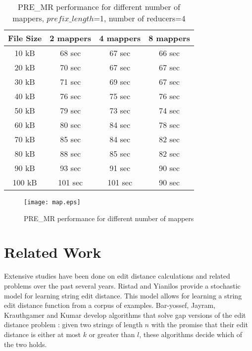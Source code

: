 \documentclass[conference]{IEEEtran}
\begin{document}
\begin{table}[htbp]
\caption{PRE\_MR performance for different number of mappers, $prefix\_length$=1, number of reducers=4}
\centering
\vspace{5pt}
\begin{tabular}{|c|c|c|c|}
\hline
\textbf{File Size} & \textbf{2 mappers} & \textbf{4 mappers} & \textbf{8 mappers}\\
\hline\hline
10 kB & 68 sec & 67 sec & 66 sec\\
\hline
20 kB & 70 sec & 67 sec & 67 sec\\
\hline
30 kB & 71 sec & 69 sec & 67 sec\\
\hline
40 kB & 76 sec & 75 sec & 76 sec\\
\hline
50 kB & 79 sec & 73 sec & 74 sec\\
\hline
60 kB & 80 sec & 84 sec & 78 sec\\
\hline
70 kB & 85 sec & 84 sec & 82 sec\\
\hline
80 kB & 88 sec & 85 sec & 82 sec\\
\hline
90 kB & 93 sec & 91 sec & 90 sec\\
\hline
100 kB & 101 sec & 101 sec & 90 sec \\
\hline
\end{tabular}
\label{table:map}
\end{table}

\begin{figure}[htbp]
\begin{center}
\texttt{[image: map.eps]}
\end{center}
\caption{PRE\_MR performance for different number of mappers}
\label{fig:map}
\end{figure}


\section{Related Work}
Extensive studies have been done on edit distance calculations and related problems over the past several years. Ristad and Yianilos \cite{Ristad} provide a stochastic model for learning string edit distance. This model allows for learning a string edit distance function from a corpus of examples. Bar-yossef, Jayram, Krauthgamer and Kumar develop algorithms that solve gap versions of the edit distance problem \cite{Yossef}: given two strings of length $n$ with the promise that their edit distance is either at most $k$ or greater than $l$, these algorithms decide which of the two holds.
\end{document}

